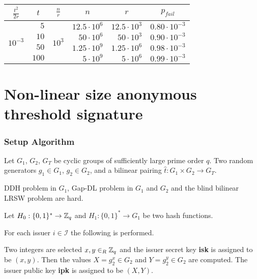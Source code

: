 \begin{center}
    \begin{tabular}{|c|r|c|r|r|c|}
        \hline
        $\frac{t^2}{2r}$ & \multicolumn{1}{c|}{$t$} & $\frac{n}{r}$ & \multicolumn{1}{c|}{$n$} & \multicolumn{1}{c|}{$r$} & $p_{fail}$ \\ \hline
        
        \multirow{4}{*}{$10^{-3}$} & $5$ & \multirow{4}{*}{$10^{3}$} & $12.5 \cdot 10^6$ & $12.5 \cdot 10^{3}$ & $0.80 \cdot 10^{-3}$ \\ \cline{2-2} \cline{4-6}
        & $10$ & & $50 \cdot 10^6$ & $50 \cdot 10^{3}$ & $0.90 \cdot 10^{-3}$ \\ \cline{2-2} \cline{4-6}
        & $50$ & & $1.25 \cdot 10^9$ & $1.25 \cdot 10^{6}$ & $0.98 \cdot 10^{-3}$ \\ \cline{2-2} \cline{4-6}
        & $100$ & & $5 \cdot 10^9$ & $5 \cdot 10^{6}$ & $0.99 \cdot 10^{-3}$ \\ \cline{2-2} \cline{4-6}
        
        \hline
    \end{tabular}
\end{center}

\cite{Deng04}

\section{Non-linear size anonymous threshold signature}
\cite{ChenNW11}
\subsubsection*{Setup Algorithm}

Let $G_1$, $G_2$, $G_T$ be cyclic groups of sufficiently large prime order $q$. Two random generators $g_1 \in G_1$, $g_2 \in G_2$, and a bilinear pairing $\hat{t}: G_1 \times G_2 \rightarrow G_T$.

DDH problem in $G_1$, Gap-DL problem in $G_1$ and $G_2$ and the blind bilinear LRSW problem are hard.

Let $H_0 : \{0,1\}^\ast \rightarrow {\mathbb Z}_q$ and $H_1 : \{ 0 , 1 \}^\ast \rightarrow G_1$ be two hash functions.

For each issuer $i \in \mathcal{I}$ the following is performed.

Two integers are selected $x,y \in_R {\mathbb Z}_q$ and the issuer secret key \textbf{isk} is assigned to be $(x,y)$. Then the values $X = g_2^{x} \in G_2$ and $Y = g_2^{y} \in G_2$ are computed. The issuer public key \textbf{ipk} is assigned to be $(X,Y)$.

